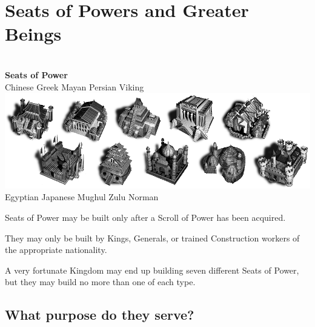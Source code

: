 
\chapter{Seats of Powers and Greater Beings}


\begin{center}
	\\ \textbf{Seats of Power}
	\\ Chinese Greek Mayan Persian Viking
	\includegraphics[width=0.7\linewidth]{Iseats}
	\\ Egyptian Japanese Mughul Zulu Norman
\end{center}

Seats of Power may be built only after a Scroll of Power has been acquired.

They may only be built by Kings, Generals, or trained Construction workers of the appropriate nationality.

A very fortunate Kingdom may end up building seven different Seats of Power, but they may build no more than one of each type.

\clearpage

\section{What purpose do they serve?}

